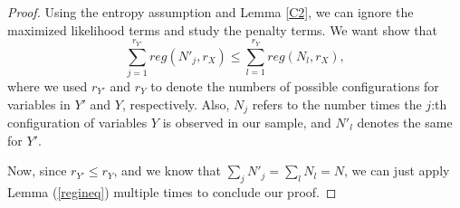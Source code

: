 \begin{proof}
Using the entropy assumption and Lemma \ref{C2}, we can ignore the maximized likelihood terms and study the penalty terms. We want show that
\begin{equation}\label{fnmlPenalty}
\sum_{j = 1}^{r_{Y'}} reg(N'_j,r_X) \leq \sum_{l = 1}^{r_{Y}} reg(N_l,r_X),
\end{equation}where we used $r_{Y'}$ and $r_Y$ to denote the numbers of possible configurations for variables in $Y'$ and $Y$, respectively. Also, $N_j$ refers to the number times the $j$:th configuration of variables $Y$ is observed in our sample, and $N'_l$ denotes the same for $Y'$. 

Now, since $r_{Y'} \leq r_Y$, and we know that $\sum_j N'_j = \sum_l N_l = N$, we can just apply Lemma (\ref{regineq}) multiple times to conclude our proof. 
\end{proof}


